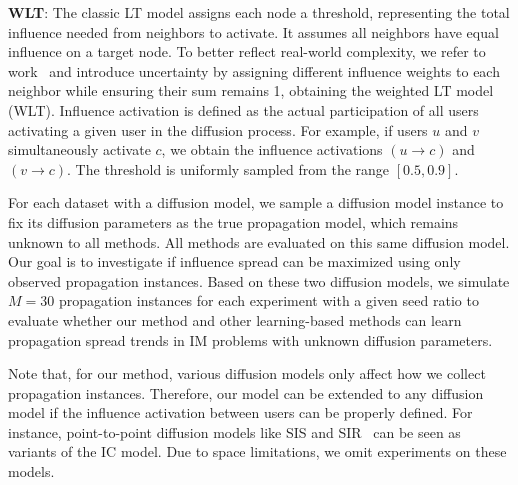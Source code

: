 \textbf{WLT}: The classic LT model assigns each node a threshold, representing the total influence needed from neighbors to activate. It assumes all neighbors have equal influence on a target node. To better reflect real-world complexity, we refer to work~\cite{kempe2003im} and introduce uncertainty by assigning different influence weights to each neighbor while ensuring their sum remains 1, obtaining the weighted LT model (WLT).
Influence activation is defined as the actual participation of all users activating a given user in the diffusion process.
For example, if users $u$ and $v$ simultaneously activate $c$, we obtain the influence activations $(u \rightarrow c)$ and $(v \rightarrow c)$. The threshold is uniformly sampled from the range $[0.5, 0.9]$.

For each dataset with a diffusion model, we sample a diffusion model instance to fix its diffusion parameters as the true propagation model, which remains unknown to all methods. All methods are evaluated on this same diffusion model.
Our goal is to investigate if influence spread can be maximized using only observed propagation instances.
Based on these two diffusion models, we simulate $M=30$ propagation instances for each experiment with a given seed ratio to evaluate whether our method and other learning-based methods can learn propagation spread trends in IM problems with unknown diffusion parameters.

Note that, for our method, various diffusion models only affect how we collect propagation instances.
Therefore, our model can be extended to any diffusion model if the influence activation between users can be properly defined.
For instance, point-to-point diffusion models like SIS  and SIR~\cite{1994_allen_SIS_SIR} can be seen as variants of the IC model. Due to space limitations, we omit experiments on these models.

